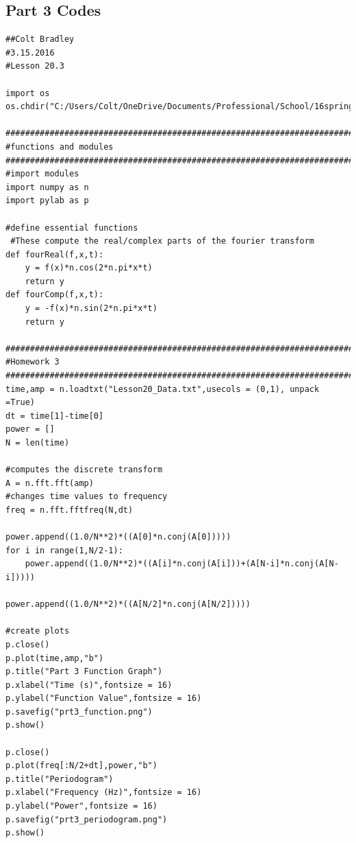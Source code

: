 \documentclass[11pt]{article}
\begin{document}
\subsection{Part 3 Codes}
\begin{verbatim}
##Colt Bradley
#3.15.2016
#Lesson 20.3

import os
os.chdir("C:/Users/Colt/OneDrive/Documents/Professional/School/16spring/PY_251/20.FourierAnalysis")

#############################################################################
#functions and modules
#############################################################################
#import modules
import numpy as n
import pylab as p

#define essential functions
 #These compute the real/complex parts of the fourier transform        
def fourReal(f,x,t):
    y = f(x)*n.cos(2*n.pi*x*t)
    return y
def fourComp(f,x,t):
    y = -f(x)*n.sin(2*n.pi*x*t)
    return y

#############################################################################
#Homework 3
#############################################################################
time,amp = n.loadtxt("Lesson20_Data.txt",usecols = (0,1), unpack =True)
dt = time[1]-time[0]
power = []
N = len(time)

#computes the discrete transform
A = n.fft.fft(amp)
#changes time values to frequency
freq = n.fft.fftfreq(N,dt)

power.append((1.0/N**2)*((A[0]*n.conj(A[0]))))
for i in range(1,N/2-1):
    power.append((1.0/N**2)*((A[i]*n.conj(A[i]))+(A[N-i]*n.conj(A[N-i]))))

power.append((1.0/N**2)*((A[N/2]*n.conj(A[N/2]))))

#create plots
p.close()
p.plot(time,amp,"b")
p.title("Part 3 Function Graph")
p.xlabel("Time (s)",fontsize = 16)
p.ylabel("Function Value",fontsize = 16)
p.savefig("prt3_function.png")
p.show()

p.close()
p.plot(freq[:N/2+dt],power,"b")
p.title("Periodogram")
p.xlabel("Frequency (Hz)",fontsize = 16)
p.ylabel("Power",fontsize = 16)
p.savefig("prt3_periodogram.png")
p.show()

\end{verbatim}
\end{document}
